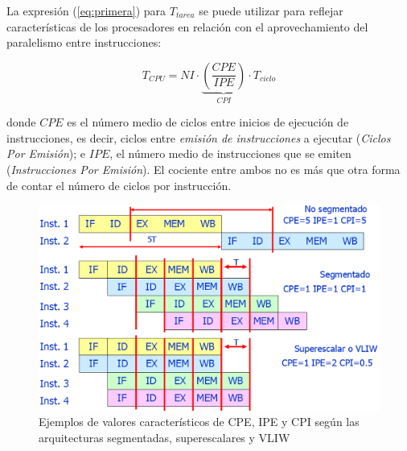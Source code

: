 \documentclass[10pt,a4paper,spanish]{report}
\begin{document}
La expresión (\ref{eq:primera}) para $T_{tarea}$ se puede utilizar para reflejar características de los procesadores en relación con el aprovechamiento del paralelismo entre instrucciones:

\begin{equation}
\label{eq:cuarta}
T_{CPU} = NI \cdot \underbrace{(\frac{CPE}{IPE})}_{CPI} \cdot T_{ciclo}
\end{equation}

donde $CPE$ es el número medio de ciclos entre inicios de ejecución de instrucciones, es decir, ciclos entre \textit{\textcolor[rgb]{0.2,0.4,0.8}{emisión de instrucciones}} a ejecutar (\textit{\textcolor[rgb]{0.2,0.4,0.8}{Ciclos Por Emisión}}); e $IPE$, el número medio de instrucciones que se emiten (\textit{\textcolor[rgb]{0.2,0.4,0.8}{Instrucciones Por Emisión}}). El cociente entre ambos no es más que otra forma de contar el número de ciclos por instrucción. 

\begin{figure}
\centering
\includegraphics[width=1\textwidth]{23}
\caption{Ejemplos de valores característicos de CPE, IPE y CPI según las arquitecturas segmentadas, superescalares y VLIW}
\label{ejemplos_cpe}
\end{figure}
\end{document}
